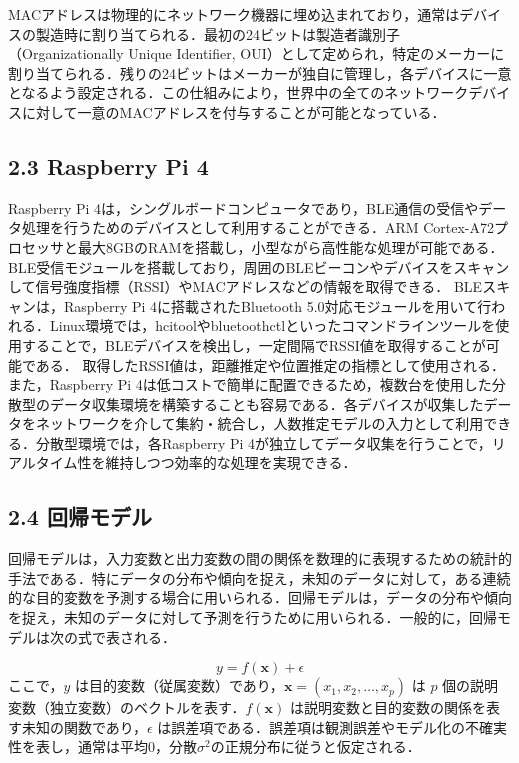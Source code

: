 MACアドレスは物理的にネットワーク機器に埋め込まれており，通常はデバイスの製造時に割り当てられる．最初の24ビットは製造者識別子（Organizationally Unique Identifier, OUI）として定められ，特定のメーカーに割り当てられる．残りの24ビットはメーカーが独自に管理し，各デバイスに一意となるよう設定される．この仕組みにより，世界中の全てのネットワークデバイスに対して一意のMACアドレスを付与することが可能となっている．

\subsection*{2.3 Raspberry Pi 4}
Raspberry Pi 4は，シングルボードコンピュータであり，BLE通信の受信やデータ処理を行うためのデバイスとして利用することができる\cite{rasPi}．ARM Cortex-A72プロセッサと最大8GBのRAMを搭載し，小型ながら高性能な処理が可能である\cite{rasPi}．BLE受信モジュールを搭載しており，周囲のBLEビーコンやデバイスをスキャンして信号強度指標（RSSI）やMACアドレスなどの情報を取得できる\cite{rasPi}．
BLEスキャンは，Raspberry Pi 4に搭載されたBluetooth 5.0対応モジュールを用いて行われる．Linux環境では，hcitoolやbluetoothctlといったコマンドラインツールを使用することで，BLEデバイスを検出し，一定間隔でRSSI値を取得することが可能である．
取得したRSSI値は，距離推定や位置推定の指標として使用される．
また，Raspberry Pi 4は低コストで簡単に配置できるため，複数台を使用した分散型のデータ収集環境を構築することも容易である．各デバイスが収集したデータをネットワークを介して集約・統合し，人数推定モデルの入力として利用できる．分散型環境では，各Raspberry Pi 4が独立してデータ収集を行うことで，リアルタイム性を維持しつつ効率的な処理を実現できる．

\subsection*{2.4 回帰モデル}
回帰モデルは，入力変数と出力変数の間の関係を数理的に表現するための統計的手法である\cite{prml}．特にデータの分布や傾向を捉え，未知のデータに対して，ある連続的な目的変数を予測する場合に用いられる．回帰モデルは，データの分布や傾向を捉え，未知のデータに対して予測を行うために用いられる．一般的に，回帰モデルは次の式で表される．

\begin{equation}
	y = f(\mathbf{x}) + \epsilon
\end{equation}
ここで，$y$ は目的変数（従属変数）であり，$\mathbf{x} = (x_1, x_2, \ldots, x_p)$ は $p$ 個の説明変数（独立変数）のベクトルを表す．$f(\mathbf{x})$ は説明変数と目的変数の関係を表す未知の関数であり，$\epsilon$ は誤差項である．誤差項は観測誤差やモデル化の不確実性を表し，通常は平均0，分散$\sigma^2$の正規分布に従うと仮定される．

